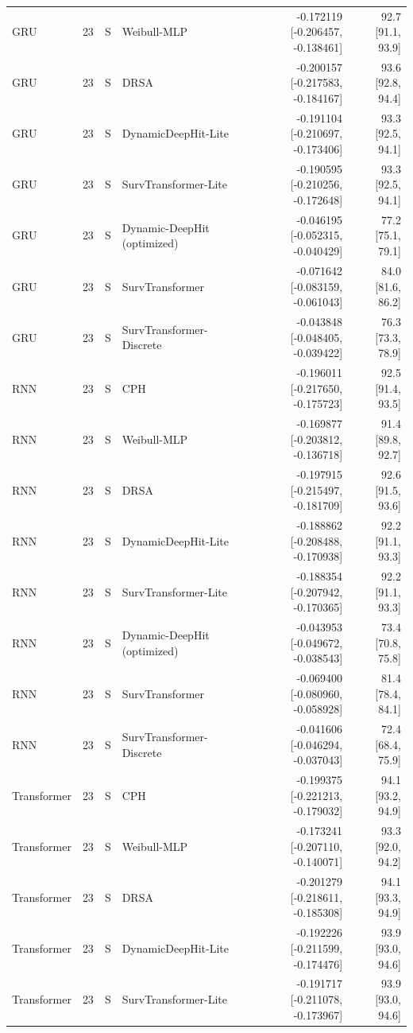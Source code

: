 \begin{longtable}{lll p{3.0cm} rr}
GRU & 23 & S & Weibull-MLP & -0.172119 [-0.206457, -0.138461] & 92.7 [91.1, 93.9]\\
GRU & 23 & S & DRSA & -0.200157 [-0.217583, -0.184167] & 93.6 [92.8, 94.4]\\
GRU & 23 & S & DynamicDeepHit-Lite & -0.191104 [-0.210697, -0.173406] & 93.3 [92.5, 94.1]\\
GRU & 23 & S & SurvTransformer-Lite & -0.190595 [-0.210256, -0.172648] & 93.3 [92.5, 94.1]\\
GRU & 23 & S & Dynamic-DeepHit (optimized) & -0.046195 [-0.052315, -0.040429] & 77.2 [75.1, 79.1]\\
GRU & 23 & S & SurvTransformer & -0.071642 [-0.083159, -0.061043] & 84.0 [81.6, 86.2]\\
GRU & 23 & S & SurvTransformer-Discrete & -0.043848 [-0.048405, -0.039422] & 76.3 [73.3, 78.9]\\
RNN & 23 & S & CPH & -0.196011 [-0.217650, -0.175723] & 92.5 [91.4, 93.5]\\
RNN & 23 & S & Weibull-MLP & -0.169877 [-0.203812, -0.136718] & 91.4 [89.8, 92.7]\\
RNN & 23 & S & DRSA & -0.197915 [-0.215497, -0.181709] & 92.6 [91.5, 93.6]\\
RNN & 23 & S & DynamicDeepHit-Lite & -0.188862 [-0.208488, -0.170938] & 92.2 [91.1, 93.3]\\
RNN & 23 & S & SurvTransformer-Lite & -0.188354 [-0.207942, -0.170365] & 92.2 [91.1, 93.3]\\
RNN & 23 & S & Dynamic-DeepHit (optimized) & -0.043953 [-0.049672, -0.038543] & 73.4 [70.8, 75.8]\\
RNN & 23 & S & SurvTransformer & -0.069400 [-0.080960, -0.058928] & 81.4 [78.4, 84.1]\\
RNN & 23 & S & SurvTransformer-Discrete & -0.041606 [-0.046294, -0.037043] & 72.4 [68.4, 75.9]\\
Transformer & 23 & S & CPH & -0.199375 [-0.221213, -0.179032] & 94.1 [93.2, 94.9]\\
Transformer & 23 & S & Weibull-MLP & -0.173241 [-0.207110, -0.140071] & 93.3 [92.0, 94.2]\\
Transformer & 23 & S & DRSA & -0.201279 [-0.218611, -0.185308] & 94.1 [93.3, 94.9]\\
Transformer & 23 & S & DynamicDeepHit-Lite & -0.192226 [-0.211599, -0.174476] & 93.9 [93.0, 94.6]\\
Transformer & 23 & S & SurvTransformer-Lite & -0.191717 [-0.211078, -0.173967] & 93.9 [93.0, 94.6]\\

\end{longtable}
